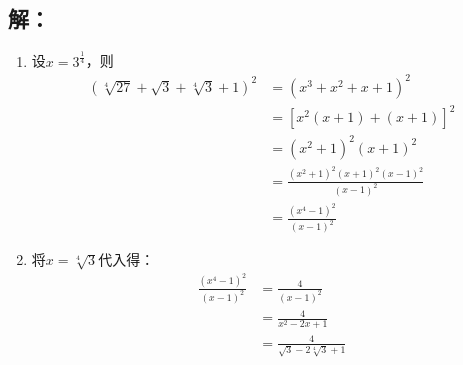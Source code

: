 \subsection*{解：}
\begin{enumerate}
	\item 设$\displaystyle x=3^{\frac{1}{4}}$，则
	      \begin{align}
		      (\sqrt[4]{27} + \sqrt{3} + \sqrt[4]{3} + 1)^2 & = (x^3 + x^2 + x + 1)^2                     \\
		                                                    & = [x^2(x+1) + (x+1)]^2                      \\
		                                                    & = (x^2 + 1)^2(x+1)^2                        \\
		                                                    & = \frac{(x^2 + 1)^2(x+1)^2(x-1)^2}{(x-1)^2} \\
		                                                    & = \frac{(x^4 - 1)^2}{(x-1)^2}
	      \end{align}
	\item 将$x=\sqrt[4]{3}$代入得：
	      \begin{align}
		      \frac{(x^4 - 1)^2}{(x-1)^2} & = \frac{4}{(x-1)^2}                     \\
		                                  & = \frac{4}{x^2 - 2x + 1}                \\
		                                  & = \frac{4}{\sqrt{3} - 2\sqrt[4]{3} + 1}
	      \end{align}
\end{enumerate}
